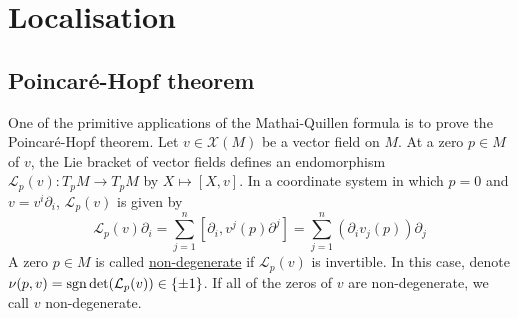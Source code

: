 \chapter{Localisation}
\section{Poincar\'e-Hopf theorem}
One of the primitive applications of the Mathai-Quillen formula is to prove the
Poincar\'e-Hopf theorem. 
Let $v\in\mathcal{X}(M)$ be a vector field on $M$.
At a zero $p\in M$ of  $v$, the Lie bracket of vector fields defines an endomorphism 
$\mathcal{L}_p(v) : T_pM \to T_pM$ by  $X\mapsto [X,v]$. In a coordinate system in
which  $p=0$ and  $v= v^i \partial_i$,  $\mathcal{L}_p(v)$ is given by 
 \[
	 \mathcal{L}_p(v)\partial_i = \sum_{j=1}^{n} [\partial_i, v^j(p)\partial^j] 
	 = \sum_{j=1}^{n} (\partial_i v_j(p)) \partial_j
\] 
A zero $p\in M$ is called \underline{non-degenerate} if  $\mathcal{L}_p(v)$ is
invertible. In this case, denote $\nu(p,v) = \operatorname{sgn} \det(\mathcal{L}_p(v)) 
\in \{\pm 1\}$. If all of the zeros of $v$ are non-degenerate, we call  $v$
non-degenerate. 

